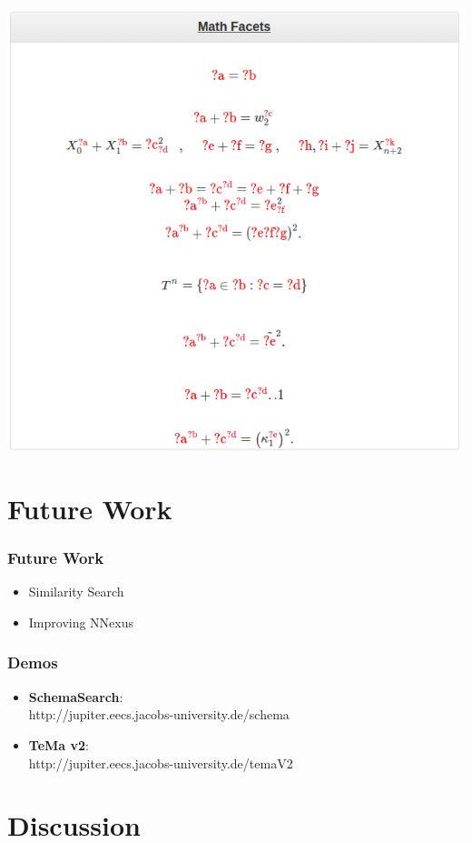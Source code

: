 \documentclass{beamer}
\begin{document}
\begin{center}
    \includegraphics[height=0.9\textheight]{img/temaV2_facets}
\end{center}
\section{Future Work}
\begin{frame}
\frametitle{Future Work}
\begin{itemize}
    \item Similarity Search
    \item Improving NNexus
\end{itemize}
\end{frame}
\begin{frame}
    \frametitle{Demos}
    \begin{itemize}
        \item \textbf{SchemaSearch}:\\
            \textsf{http://jupiter.eecs.jacobs-university.de/schema}
        \item \textbf{TeMa v2}:\\
            \textsf{http://jupiter.eecs.jacobs-university.de/temaV2}
    \end{itemize}
\end{frame}
\section{Discussion}
\begin{frame}
\tableofcontents
\end{frame}
\end{document}
